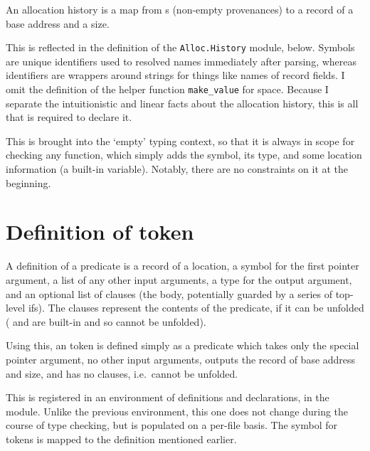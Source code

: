 An allocation history is a map from s (non-empty provenances) to a
record of a base address and a size.

This is reflected in the definition of the \texttt{Alloc.History}
module, below. Symbols  are unique identifiers used to
resolved names immediately after parsing, whereas identifiers are wrappers
around strings for things like names of record fields. I omit the definition of
the helper function \texttt{make_value} for space. Because I
separate the intuitionistic and linear facts about the allocation history, this
is all that is required to declare it.


This is brought into the `empty' typing context, so that it is always in scope
for checking any function, which simply adds the symbol, its type, and some
location information (a built-in variable). Notably, there are no constraints
on it at the beginning.


\section{Definition of  token}

A definition of a predicate is a record of a location, a symbol for the first
pointer argument, a list of any other input arguments, a type for the output
argument, and an optional list of clauses (the body, potentially guarded by a
series of top-level ifs). The clauses represent the contents of the predicate,
if it can be unfolded ( and  are built-in and
so cannot be unfolded).


Using this, an  token is defined simply as a predicate which
takes only the special pointer argument, no other input arguments, outputs the
record of base address and size, and has no clauses, i.e.\ cannot be unfolded.


This is registered in an environment of definitions and declarations, in the
 module. Unlike the previous environment, this one does not
change during the course of type checking, but is populated on a per-file
basis. The symbol for  tokens is mapped to the definition
mentioned earlier.

